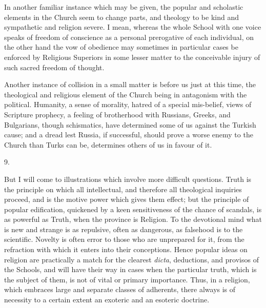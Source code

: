 In another familiar instance which may be given, the popular and
scholastic elements in the Church seem to change parts, and theology
to be kind and sympathetic and religion severe. I mean, whereas the
whole School with one voice speaks of freedom of conscience as a
personal prerogative of each individual, on the other hand the vow of
obedience may sometimes in particular cases be enforced by Religious
Superiors in some lesser matter to the conceivable injury of such
sacred freedom of thought.

Another instance of collision in a small matter is before us just
at this time, the theological and religious element of the Church
being in antagonism with the political. Humanity, a sense of morality,
hatred of a special mis-belief, views of Scripture prophecy, a feeling
of brotherhood with Russians, Greeks, and Bulgarians, though
schismatics, have determined some of us against the Turkish cause; and
a dread lest Russia, if successful, should prove a worse enemy to the
Church than Turks can be, determines others of us in favour of it.

9.

But I will come to illustrations which involve more difficult
questions. Truth is the principle on which all intellectual, and
therefore all theological inquiries proceed, and is the motive power
which gives them effect; but the principle of popular
edification, quickened by a keen sensitiveness of the chance of
scandals, is as powerful as Truth, when the province is Religion. To
the devotional mind what is new and strange is as repulsive, often as
dangerous, as falsehood is to the scientific. Novelty is often error
to those who are unprepared for it, from the refraction with which it
enters into their conceptions. Hence popular ideas on religion are
practically a match for the clearest \emph{dicta}, deductions, and
provisos of the Schools, and will have their way in cases when the
particular truth, which is the subject of them, is not of vital or
primary importance. Thus, in a religion, which embraces large and
separate classes of adherents, there always is of necessity to a
certain extent an exoteric and an esoteric doctrine.

